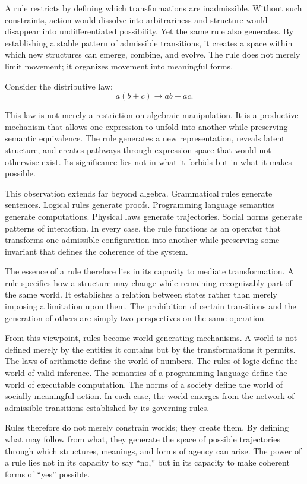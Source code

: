 \documentclass[12pt,letterpaper]{article}
\theoremstyle{remark}
\begin{document}
A rule restricts by defining which transformations are inadmissible. Without such constraints, action would dissolve into arbitrariness and structure would disappear into undifferentiated possibility. Yet the same rule also generates. By establishing a stable pattern of admissible transitions, it creates a space within which new structures can emerge, combine, and evolve. The rule does not merely limit movement; it organizes movement into meaningful forms.

Consider the distributive law:
\[
a(b + c) \to ab + ac.
\]

This law is not merely a restriction on algebraic manipulation. It is a productive mechanism that allows one expression to unfold into another while preserving semantic equivalence. The rule generates a new representation, reveals latent structure, and creates pathways through expression space that would not otherwise exist. Its significance lies not in what it forbids but in what it makes possible.

This observation extends far beyond algebra. Grammatical rules generate sentences. Logical rules generate proofs. Programming language semantics generate computations. Physical laws generate trajectories. Social norms generate patterns of interaction. In every case, the rule functions as an operator that transforms one admissible configuration into another while preserving some invariant that defines the coherence of the system.

The essence of a rule therefore lies in its capacity to mediate transformation. A rule specifies how a structure may change while remaining recognizably part of the same world. It establishes a relation between states rather than merely imposing a limitation upon them. The prohibition of certain transitions and the generation of others are simply two perspectives on the same operation.

From this viewpoint, rules become world-generating mechanisms. A world is not defined merely by the entities it contains but by the transformations it permits. The laws of arithmetic define the world of numbers. The rules of logic define the world of valid inference. The semantics of a programming language define the world of executable computation. The norms of a society define the world of socially meaningful action. In each case, the world emerges from the network of admissible transitions established by its governing rules.

Rules therefore do not merely constrain worlds; they create them. By defining what may follow from what, they generate the space of possible trajectories through which structures, meanings, and forms of agency can arise. The power of a rule lies not in its capacity to say “no,” but in its capacity to make coherent forms of “yes” possible.
\end{document}
